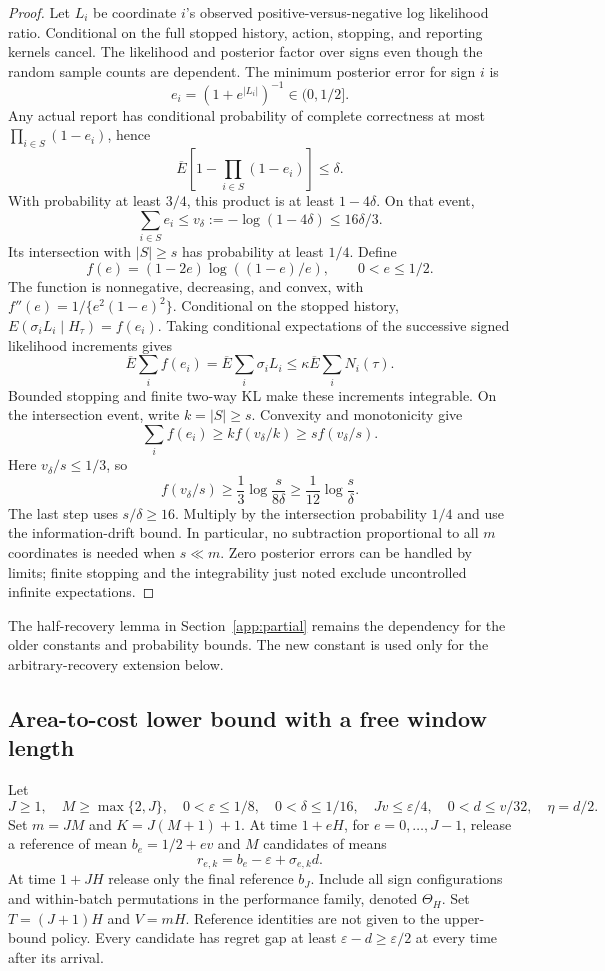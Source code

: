 \documentclass[11pt]{article}
\theoremstyle{remark}
\begin{document}
\begin{proof}
Let $L_i$ be coordinate $i$'s observed positive-versus-negative log
likelihood ratio. Conditional on the full stopped history, action,
stopping, and reporting kernels cancel. The likelihood and posterior
factor over signs even though the random sample counts are dependent.
The minimum posterior error for sign $i$ is
\[
 e_i=(1+e^{|L_i|})^{-1}\in(0,1/2].
\]
Any actual report has conditional probability of complete correctness
at most $\prod_{i\in S}(1-e_i)$, hence
\[
 \overline E\left[1-\prod_{i\in S}(1-e_i)\right]\le\delta.
\]
With probability at least $3/4$, this product is at least $1-4\delta$.
On that event,
\[
 \sum_{i\in S}e_i\le v_\delta:=-\log(1-4\delta)
                              \le16\delta/3.
\]
Its intersection with $|S|\ge s$ has probability at least $1/4$.
Define
\[
 f(e)=(1-2e)\log((1-e)/e),\qquad 0<e\le1/2.
\]
The function is nonnegative, decreasing, and convex, with
$f''(e)=1/\{e^2(1-e)^2\}$. Conditional on the stopped history,
$E(\sigma_iL_i\mid H_\tau)=f(e_i)$. Taking conditional expectations
of the successive signed likelihood increments gives
\[
 \overline E\sum_i f(e_i)=\overline E\sum_i\sigma_iL_i
                   \le\kappa\overline E\sum_iN_i(\tau).
\]
Bounded stopping and finite two-way KL make these increments integrable.
On the intersection event, write $k=|S|\ge s$. Convexity and monotonicity
give
\[
 \sum_i f(e_i)\ge k f(v_\delta/k)\ge s f(v_\delta/s).
\]
Here $v_\delta/s\le1/3$, so
\[
 f(v_\delta/s)\ge\frac13\log\frac{s}{8\delta}
                   \ge\frac1{12}\log\frac{s}{\delta}.
\]
The last step uses $s/\delta\ge16$. Multiply by the intersection
probability $1/4$ and use the information-drift bound. In particular,
no subtraction proportional to all $m$ coordinates is needed when
$s\ll m$. Zero posterior errors can be handled by limits; finite
stopping and the integrability just noted exclude uncontrolled infinite
expectations.
\end{proof}

The half-recovery lemma in Section~\ref{app:partial} remains the
dependency for the older constants and probability bounds. The new
constant is used only for the arbitrary-recovery extension below.

\subsection{Area-to-cost lower bound with a free window length}

Let
\[
 J\ge1,\quad M\ge\max\{2,J\},\quad 0<\varepsilon\le1/8,\quad
 0<\delta\le1/16,\quad Jv\le\varepsilon/4,\quad
 0<d\le v/32,\quad\eta=d/2.
\]
Set $m=JM$ and $K=J(M+1)+1$. At time $1+eH$, for
$e=0,\ldots,J-1$, release a reference of mean $b_e=1/2+ev$ and
$M$ candidates of means
\[
 r_{e,k}=b_e-\varepsilon+\sigma_{e,k}d.
\]
At time $1+JH$ release only the final reference $b_J$. Include all
sign configurations and within-batch permutations in the performance
family, denoted $\Theta_H$. Set $T=(J+1)H$ and $V=mH$. Reference
identities are not given to the upper-bound policy. Every candidate
has regret gap at least $\varepsilon-d\ge\varepsilon/2$ at every time
after its arrival.
\end{document}
